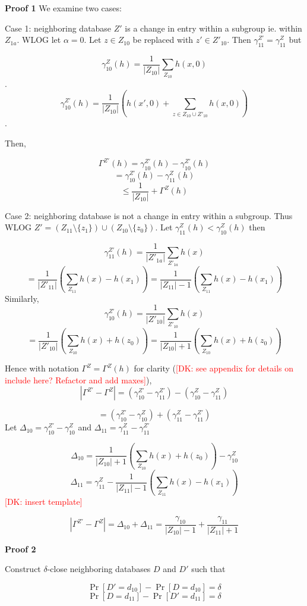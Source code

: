 \documentclass[format = sigconf]{acmart}
\newcommand{\dk}[1]{\textcolor{red}{[DK: #1]}}
\newcommand{\1}{\mathbbm{1}}
\theoremstyle{definition}
\begin{document}
{\bf Proof 1}
We examine two cases:

Case 1: neighboring database $Z'$ is a change in entry within a subgroup ie. within $Z_{1a}$. WLOG let $\alpha = 0$. Let $z \in Z_{10}$ be replaced with $z' \in Z'_{10}$. Then $\gamma^{Z'}_{11} = \gamma^Z_{11}$ but

$$\gamma_{10}^Z(h) = \frac{1}{|Z_{10}|} \sum_{Z_{10}} h(x,0)$$.
$$\gamma_{10}^{Z'}(h) = \frac{1}{|Z_{10}|} (h(x', 0) +\sum_{z \in Z_{10} \cup Z'_{10}} h(x, 0))$$.

Then,

$$ \Gamma^{Z'}(h) = \gamma_{10}^{Z'}(h) - \gamma_{10}^{Z'}(h) $$
$$ = \gamma_{10}^{Z'}(h) - \gamma^Z_{11}(h) $$
$$ \leq \frac{1}{|Z_{10}|}  + \Gamma^{Z}(h) $$


Case 2: neighboring database is not a change in entry within a subgroup. Thus WLOG $Z' =(Z_{11}\setminus \{z_1\} )\cup( Z_{10}\setminus \{z_0\})$. Let $\gamma_{11}^{Z}(h) <\gamma_{10}^{Z}(h)$ then

$$\gamma_{11}^{Z'}(h) = \frac{1}{|Z'_{1a}|} \sum_{Z'_{1a}} h(x)$$
$$= \frac{1}{|Z'_{11}|} (\sum_{Z_{11}} h(x)-h(x_1)) = \frac{1}{|Z_{11}|-1} (\sum_{Z_{11}} h(x)-h(x_1))$$
Similarly, 
$$\gamma_{10}^{Z'}(h) = \frac{1}{|Z'_{10}|} \sum_{Z'_{10}} h(x)$$
$$ = \frac{1}{|Z'_{10}|} (\sum_{Z_{10}} h(x)+h(z_0))= \frac{1}{|Z_{10}|+1} (\sum_{Z_{10}} h(x)+h(z_0))$$

Hence with notation $ \Gamma^Z = \Gamma^Z(h)$ for clarity (\dk{see appendix for details on include here? Refactor and add maxes}), $$|\Gamma^{Z'}- \Gamma^{Z}| = (\gamma_{10}^{Z'} - \gamma_{11}^{Z'}) - (\gamma_{10}^{Z} - \gamma_{11}^{Z})$$


$$=(\gamma_{10}^{Z'}- \gamma_{10}^{Z}) + (\gamma_{11}^{Z} -\gamma_{11}^{Z'})$$
Let $\Delta_{10}= \gamma_{10}^{Z'}- \gamma_{10}^{Z}$ and  $\Delta_{11} = \gamma_{11}^{Z} -\gamma_{11}^{Z'}$

$$\Delta_{10} = \frac{1}{|Z_{10}|+1} (\sum_{Z_{10}} h(x)+h(z_0)) - \gamma_{10}^{Z}$$
$$\Delta_{11} = \gamma_{11}^{Z}- \frac{1}{|Z_{11}|-1} (\sum_{Z_{11}} h(x)-h(x_1))$$
\dk {insert template}

$$|\Gamma^{Z'}- \Gamma^{Z}| = \Delta_{10} + \Delta_{11}= \frac{\gamma_{10}}{|Z_{10}|-1} + \frac{\gamma_{11}}{|Z_{11}|+1} $$

{\bf Proof 2}

Construct $\delta$-close neighboring databases $D$ and $D'$ such that

$$\Pr[D'=d_{10}] - \Pr[D=d_{10}] = \delta$$
$$\Pr[D=d_{11}] - \Pr[D'=d_{11}] = \delta$$
\end{document}

